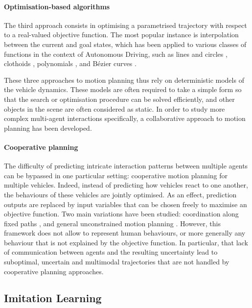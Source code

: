 \paragraph{Optimisation-based algorithms}

The third approach consists in optimising a parametrised trajectory with respect to a real-valued objective function. The most popular instance is interpolation between the current and goal states, which has been applied to various classes of functions in the context of Autonomous Driving, such as lines and circles \citep{Reeds1990}, clothoids \citep{Funke2012}, polynomials \citep{Xu2012}, and Bézier curves \citep{Gonzalez2016}.

These three approaches to motion planning thus rely on deterministic models of the vehicle dynamics. These models are often required to take a simple form so that the search or optimisation procedure can be solved efficiently, and other objects in the scene are often considered as static. In order to study more complex multi-agent interactions specifically, a collaborative approach to motion planning has been developed.

\paragraph{Cooperative planning}

The difficulty of predicting intricate interaction patterns between multiple agents can be bypassed in one particular setting: cooperative motion planning for multiple vehicles. Indeed, instead of predicting how vehicles react to one another, the behaviours of these vehicles are jointly optimised. As an effect, prediction outputs are replaced by input variables that can be chosen freely to maximise an objective function. Two main variations have been studied: coordination along fixed paths \citep{Altche2016,Altche2016b,Altche2017}, and general unconstrained motion planning \citep{LaValle1998}.
However, this framework does not allow to represent human behaviours, or more generally any behaviour that is not explained by the objective function. In particular, that lack of communication between agents and the resulting uncertainty lead to suboptimal, uncertain and multimodal trajectories that are not handled by cooperative planning approaches.


\subsection{Imitation Learning}
\label{sec:imitation-learning}

